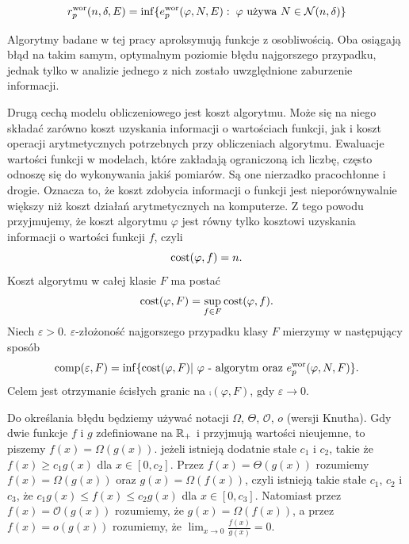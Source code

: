 \documentclass[oik, pdftex, man]{mgrwms}
\begin{document}
    \begin{equation*}
        r^{\mathrm{wor}}_{p}(n, \delta, E) = \inf\{ e_{p}^{\mathrm{wor}}(\varphi, N, E) : \; \varphi \text{ używa } N \in \mathcal{N}(n, \delta) \}
    \end{equation*}


    Algorytmy badane w tej pracy aproksymują funkcje z osobliwością. Oba osiągają błąd na takim samym, optymalnym poziomie błędu najgorszego przypadku, jednak tylko w analizie jednego z nich zostało uwzględnione zaburzenie informacji.

    Drugą cechą modelu obliczeniowego jest koszt algorytmu. Może się na niego składać zarówno koszt uzyskania informacji o wartościach funkcji, jak i koszt operacji arytmetycznych potrzebnych przy obliczeniach algorytmu. Ewaluacje wartości funkcji w modelach, które zakładają ograniczoną ich liczbę, często odnoszę się do wykonywania jakiś pomiarów. Są one nierzadko pracochłonne i drogie. Oznacza to, że koszt zdobycia informacji o funkcji jest nieporównywalnie większy niż koszt działań arytmetycznych na komputerze. Z tego powodu przyjmujemy, że koszt algorytmu $\varphi$ jest równy tylko kosztowi uzyskania informacji o wartości funkcji $f$, czyli
    \begin{equation*}
        \mathrm{cost}(\varphi, f) = n.
    \end{equation*}
    Koszt algorytmu w całej klasie $F$ ma postać
    \begin{equation*}
        \mathrm{cost}(\varphi, F) = \sup_{f \in F} \mathrm{cost}(\varphi, f).
    \end{equation*}
    Niech $\varepsilon > 0$. $\varepsilon$-złożoność najgorszego przypadku klasy $F$ mierzymy w następujący sposób
    \begin{equation*}
        \mathrm{comp}(\varepsilon, F) = \inf \{\mathrm{cost}(\varphi, F) | \text{ $\varphi$ - algorytm oraz } e_{p}^{\mathrm{wor}}(\varphi, N, F)\}.
    \end{equation*}
    Celem jest otrzymanie ścisłych granic na $\comp(\varphi, F)$, gdy $\varepsilon \rightarrow 0$.

    Do określania błędu będziemy używać notacji $\varOmega$, $\varTheta$, $\mathcal{O}$, $\textit{o}$ (wersji Knutha). Gdy dwie funkcje $f$ i $g$ zdefiniowane na $\mathbb{R}_{+}$ i przyjmują wartości nieujemne, to piszemy $f(x) = \varOmega\left( g(x) \right)$. jeżeli istnieją dodatnie stałe $c_{1}$ i $c_{2}$, takie że $f(x) \geq c_{1} g(x)$ dla $x \in [0, c_{2}]$. Przez $f(x) = \varTheta\left( g(x) \right)$ rozumiemy $f(x) = \varOmega\left( g(x) \right)$ oraz $g(x) = \varOmega\left( f(x) \right)$, czyli istnieją takie stałe $c_{1}$, $c_{2}$ i $c_{3}$, że $c_{1} g(x) \leq f(x) \leq c_{2} g(x)$ dla $x \in [0, c_{3}]$. Natomiast przez $f(x) = \mathcal{O}(g(x))$ rozumiemy, że $g(x) = \varOmega(f(x))$, a przez $f(x) = \textit{o}(g(x))$ rozumiemy, że $\displaystyle \lim_{x \rightarrow 0} \frac{f(x)}{g(x)} = 0$.
\end{document}
